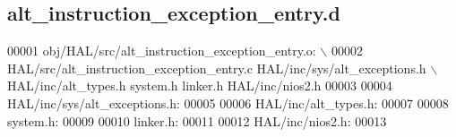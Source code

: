 \subsection{alt\+\_\+instruction\+\_\+exception\+\_\+entry.\+d}
\label{alt__instruction__exception__entry_8d_source}

\begin{DoxyCode}
00001 obj/HAL/src/alt_instruction_exception_entry.o: \(\backslash\)
00002  HAL/src/alt_instruction_exception_entry.c HAL/inc/sys/alt\_exceptions.h \(\backslash\)
 HAL/inc/alt\_types.h system.h linker.h HAL/inc/nios2.h
00003 
00004 HAL/inc/sys/alt\_exceptions.h:
00005 
00006 HAL/inc/alt\_types.h:
00007 
00008 system.h:
00009 
00010 linker.h:
00011 
00012 HAL/inc/nios2.h:
00013 \end{DoxyCode}
